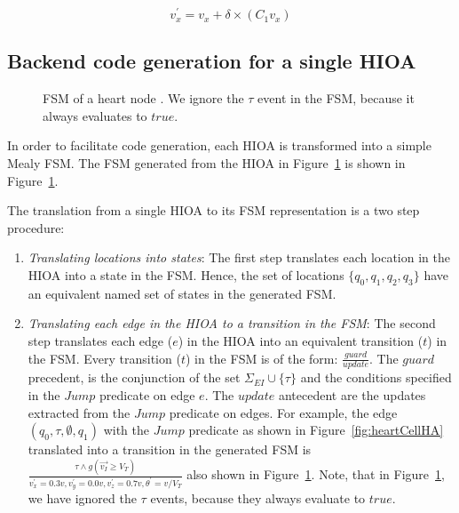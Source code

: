 \begin{equation}
  v^\prime_x = v_x + \delta \times (C_{1} v_x)
  \label{eq:euler_equiv}
\end{equation}


\subsection{Backend code generation for a single \ac{HIOA}}
\label{sec:backendCodeGeneration}

\begin{figure}
  \centering 
  \caption{\acf{FSM} of a heart node \label{fig:heartCellFSM}. We ignore
    the $\tau$ event in the \ac{FSM}, because it always evaluates to
    $true$.}
\end{figure}

In order to facilitate code generation, each \ac{HIOA} is transformed
into a simple Mealy \ac{FSM}. The \ac{FSM} generated from the \ac{HIOA}
in Figure~\ref{fig:heartCellFSM} is shown in
Figure~\ref{fig:heartCellFSM}.

The translation from a single \ac{HIOA} to its \ac{FSM} representation
is a two step procedure:

\begin{enumerate}
\item \textit{Translating locations into states}: The first step
  translates each location in the \ac{HIOA} into a state in the
  \ac{FSM}. Hence, the set of locations $\{q_{0}, q_{1}, q_{2}, q_{3}\}$
  have an equivalent named set of states in the generated \ac{FSM}.
\item \textit{Translating each edge in the \ac{HIOA} to a transition in
    the \ac{FSM}}: The second step translates each edge ($e$) in the
  \ac{HIOA} into an equivalent transition ($t$) in the \ac{FSM}. Every
  transition ($t$) in the \ac{FSM} is of the form:
  $\frac{guard}{update}$. The $guard$ precedent, is the conjunction of
  the set $\Sigma_{EI} \cup \{\tau\}$ and the conditions specified in
  the $Jump$ predicate on edge $e$. The $update$ antecedent are the
  updates extracted from the $Jump$ predicate on edges. For example, the
  edge $(q_{0}, \tau, \emptyset, q_{1})$ with the $Jump$ predicate as
  shown in Figure~\ref{fig:heartCellHA} translated into a transition in
  the generated \ac{FSM} is
  $\frac{\tau \wedge g(\vec{v_{I}} \geq V_{T})}{v^{\prime}_{x} = 0.3v,
    v^{\prime}_{y}=0.0v, v^{\prime}_{z}=0.7v, \theta^{\prime}=v/V_{T}}$
  also shown in Figure~\ref{fig:heartCellFSM}. Note, that in
  Figure~\ref{fig:heartCellFSM}, we have ignored the $\tau$ events,
  because they always evaluate to $true$.

\end{enumerate}

